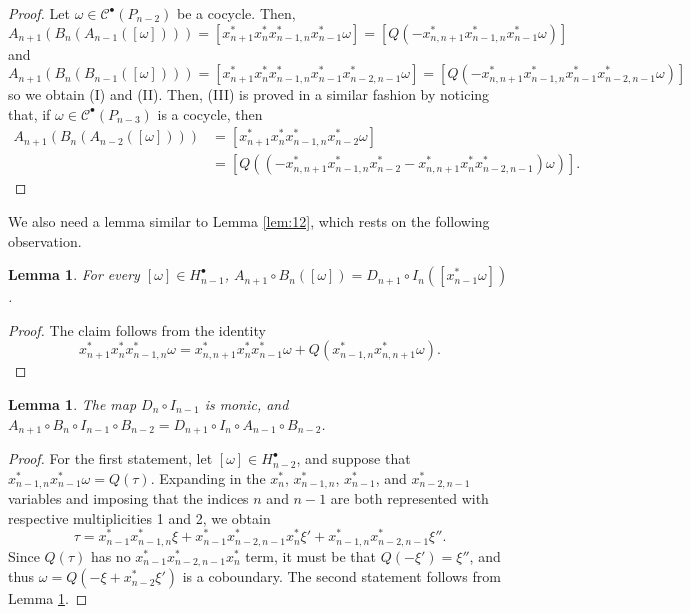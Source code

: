 \documentclass[12pt]{amsart}
\newtheorem{lem}[theorem]{Lemma}
\theoremstyle{definition}
\begin{document}
\begin{proof} Let $\omega\in \mathcal C^\bullet (P_{n-2})$ be a cocycle. Then,
\[A_{n+1}( B_n(A_{n-1}([\omega])))=[x_{n+1}^*x_n^*x_{n-1,n}^*x_{n-1}^*\omega]=[Q(-x_{n,n+1}^*x_{n-1,n}^*x_{n-1}^*\omega)]\]
and
\[A_{n+1}(B_n(B_{n-1}([\omega])))=[x_{n+1}^*x_n^*x_{n-1,n}^*x_{n-1}^*x_{n-2,n-1}^*\omega] =[ Q(-x_{n,n+1}^*x_{n-1,n}^*x_{n-1}^*x_{n-2,n-1}^*\omega)]\]
so we obtain (I) and (II). Then, (III) is proved in a similar fashion by noticing that, if $\omega\in \mathcal C^\bullet (P_{n-3})$ is a cocycle, then
\begin{align*}
A_{n+1}(B_n(A_{n-2}([\omega])))&=[x_{n+1}^*x_n^*x_{n-1,n}^*x_{n-2}^*\omega]\\
&=[Q((-x_{n,n+1}^*x_{n-1,n}^*x_{n-2}^*-x_{n,n+1}^*x_n^*x_{n-2,n-1}^*)\omega)].
\end{align*}
\end{proof}

We also need a lemma similar to Lemma \ref{lem:12}, which rests on the following observation. 

\begin{lem}\label{lem:22}
For every $[\omega]\in H_{n-1}^\bullet$, $A_{n+1}\circ B_n([\omega])=D_{n+1}\circ I_n([x_{n-1}^*\omega])$.
\end{lem}

\begin{proof}
The claim follows from the identity
\[
x_{n+1}^*x_n^*x_{n-1,n}^*\omega = x_{n,n+1}^*x_n^*x_{n-1}^*\omega+Q(x_{n-1,n}^* x_{n,n+1}^*\omega).
\]
\end{proof}

\begin{lem}\label{lem:16}
The map $D_n\circ I_{n-1}$ is monic, and $A_{n+1}\circ B_n\circ I_{n-1}\circ B_{n-2}=D_{n+1}\circ I_n\circ A_{n-1}\circ B_{n-2}$. 
\end{lem}

\begin{proof} For the first statement, let $[\omega] \in H_{n-2}^\bullet$, and suppose that $x_{n-1,n}^*x_{n-1}^*\omega=Q(\tau)$. Expanding in the $x_n^*$, $x_{n-1,n}^*$, $x_{n-1}^*$, and $x_{n-2,n-1}^*$ variables and imposing that the indices $n$ and $n-1$ are both represented with respective multiplicities 1 and 2, we obtain
\[
\tau=x_{n-1}^*x_{n-1,n}^* \xi + x_{n-1}^*x_{n-2,n-1}^*x_n^* \xi' + x_{n-1,n}^*x_{n-2,n-1}^* \xi''.
\]
Since $Q(\tau)$ has no $x_{n-1}^*x_{n-2,n-1}^*x_n^*$ term, it must be that $Q(-\xi')=\xi''$, and thus $\omega=Q(-\xi+ x_{n-2}^*\xi')$ is a coboundary. The second statement follows from Lemma \ref{lem:22}.
\end{proof}
\end{document}
